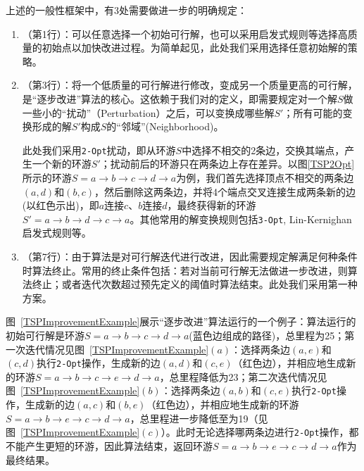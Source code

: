 上述的一般性框架中，有3处需要做进一步的明确规定：
\begin{enumerate}[(1)]
\item 
 （第1行）：可以任意选择一个初始可行解，也可以采用启发式规则等选择高质量的初始点以加快改进过程。为简单起见，此处我们采用选择任意初始解的策略。

\item  {}（第3行）：将一个低质量的可行解进行修改，变成另一个质量更高的可行解，是“逐步改进”算法的核心。这依赖于我们对的定义，即需要规定对一个解$S$做一些小的“扰动”（Perturbation）之后，可以变换成哪些解$S'$；所有可能的变换形成的解$S'$构成$S$的“邻域”(Neighborhood)。

      此处我们采用{\tt 2-Opt}扰动，即从环游$S$中选择不相交的2条边，交换其端点，产生一个新的环游$S'$；扰动前后的环游只在两条边上存在差异。以图\ref{TSP2Opt}所示的环游$S=a\rightarrow b \rightarrow c \rightarrow d \rightarrow a$为例，我们首先选择顶点不相交的两条边$(a, d)$和$(b, c)$，然后删除这两条边，并将4个端点交叉连接生成两条新的边(以红色示出)，即$a$连接$c$、$b$连接$d$，最终获得新的环游$S'=a\rightarrow b \rightarrow d \rightarrow c \rightarrow a$。其他常用的解变换规则包括{\tt 3-Opt}, Lin-Kernighan启发式规则等\cite{LinKernighan1973}。

\item {}（第7行）：由于算法是对可行解迭代进行改进，因此需要规定解满足何种条件时算法终止。常用的终止条件包括：若对当前可行解无法做进一步改进，则算法终止；或者迭代次数超过预先定义的阈值时算法结束。此处我们采用第一种方案。
\end{enumerate}

    图~\ref{TSPImprovementExample}展示“逐步改进”算法运行的一个例子：算法运行的初始可行解是环游$S=a\rightarrow b \rightarrow c \rightarrow d \rightarrow a$(蓝色边组成的路径)，总里程为25；第一次迭代情况见图~\ref{TSPImprovementExample}$(a)$：选择两条边$(a, e)$和$(c, d)$执行{\tt 2-Opt}操作，生成新的边$(a, d)$和$(c, e)$（红色边），并相应地生成新的环游$S=a\rightarrow b \rightarrow c \rightarrow e \rightarrow d \rightarrow a$，总里程降低为23；第二次迭代情况见图~\ref{TSPImprovementExample}$(b)$：选择两条边$(a, b)$和$(c, e)$执行{\tt 2-Opt}操作，生成新的边$(a, c)$和$(b, e)$（红色边），并相应地生成新的环游$S=a\rightarrow b \rightarrow e \rightarrow c \rightarrow d \rightarrow a$，总里程进一步降低至为19（见图~\ref{TSPImprovementExample}$(c)$）。此时无论选择哪两条边进行{\tt 2-Opt}操作，都不能产生更短的环游，因此算法结束，返回环游$S=a\rightarrow b \rightarrow e \rightarrow c \rightarrow d \rightarrow a$作为最终结果。

